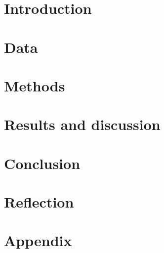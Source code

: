 \documentclass[12pt]{article}
\begin{document}


\section{Introduction}

\pagebreak

\section{Data}

\pagebreak

\section{Methods}

\pagebreak

\section{Results and discussion}

\pagebreak

\section{Conclusion}

\pagebreak

\section{Reflection}

\pagebreak




\pagebreak

\section*{Appendix}

\end{document}
